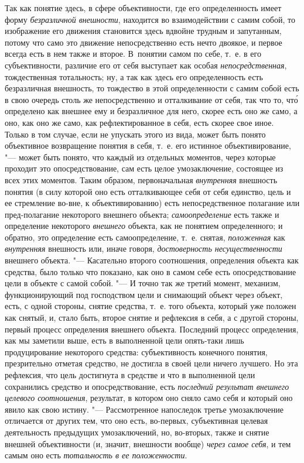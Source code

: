 {{Так как понятие здесь, в сфере объективности, где его
определенность имеет форму
{\em безразличной внешности},
находится во взаимодействии с самим собой, то изображение его
движения становится здесь вдвойне трудным и запутанным, потому что само это
движение непосредственно есть нечто двоякое, и первое всегда есть в нем
также и второе. В~понятии самом по себе, т.~е. в его субъективности,
различие его от себя выступает как особая
{\em непосредственная},
тождественная тотальность; ну, а так как здесь его
определенность есть безразличная внешность, то тождество в этой
определенности с самим собой есть в свою очередь столь же непосредственно и
отталкивание от себя, так что то, чт\'{о} определено как внешнее ему и
безразличное для него, скорее есть оно же само, а оно, как оно же само, как
рефлектированное в себя, есть скорее свое иное. Только в том случае, если
не упускать этого из вида, может быть понято объективное возвращение
понятия в себя, т.~е. его истинное объективирование, "--- может
быть понято, что каждый из отдельных моментов, через которые проходит это
опосредствование, сам есть целое умозаключение, состоящее из всех этих
моментов. Таким образом, первоначальная
{\em внутренняя}
внешность понятия (в силу которой оно есть отталкивающее себя
от себя единство, цель и ее стремление во-вне, к объективированию) есть
непосредственное полагание или пред-полагание некоторого внешнего объекта;
{\em самоопределение}
есть также и определение некоторого
{\em внешнего} объекта,
как не понятием определенного; и обратно, это определение есть
самоопределение, т.~е. снятая,
{\em положенная} как
{\em внутренняя}
внешность или, иначе говоря,
{\em достоверность несущественности}
внешнего объекта. "--- Касательно второго
соотношения, определения объекта как средства, было только что показано,
как оно в самом себе есть опосредствование цели в объекте с самой собой. "---
И точно так же третий момент, механизм, функционирующий под
господством цели и снимающий объект через объект, есть, с одной стороны,
снятие средства, т.~е. того объекта, который уже положен как снятый, и,
стало быть, второе снятие и рефлексия в себя, а с другой стороны, первый
процесс определения внешнего объекта. Последний процесс определения, как мы
заметили выше, есть в выполненной цели опять-таки лишь
продуцирование некоторого средства: субъективность конечного понятия,
презрительно отметая средство, не достигла в своей цели ничего лучшего. Но
эта рефлексия, что цель достигнута в средстве и что в выполненной цели
сохранились средство и опосредствование, есть
{\em последний результат внешнего
целевого соотношения}, результат, в котором оно сняло само
себя и который оно явило как свою истину. "--- Рассмотренное
напоследок третье умозаключение отличается от других тем, что оно есть,
во-первых, субъективная целевая деятельность предыдущих умозаключений, но,
во-вторых, также и снятие внешней объективности (и, значит, внешности
вообще) {\em через самое себя},
и тем самым оно есть
{\em тотальность в ее положенности}.

}}
